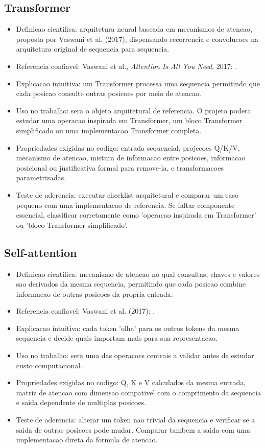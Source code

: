 \subsection{Transformer}


\begin{itemize}
\item Definicao cientifica: arquitetura neural baseada em mecanismos de atencao,
proposta por Vaswani et al. (2017), dispensando recorrencia e convolucoes na
arquitetura original de sequencia para sequencia.
\item Referencia confiavel: Vaswani et al., \emph{Attention Is All You Need}, 2017:
.
\item Explicacao intuitiva: um Transformer processa uma sequencia permitindo que
cada posicao consulte outras posicoes por meio de atencao.
\item Uso no trabalho: sera o objeto arquitetural de referencia. O projeto podera
estudar uma operacao inspirada em Transformer, um bloco Transformer
simplificado ou uma implementacao Transformer completa.
\item Propriedades exigidas no codigo: entrada sequencial, projecoes Q/K/V,
mecanismo de atencao, mistura de informacao entre posicoes, informacao
posicional ou justificativa formal para remove-la, e transformacoes
parametrizadas.
\item Teste de aderencia: executar checklist arquitetural e comparar um caso
pequeno com uma implementacao de referencia. Se faltar componente essencial,
classificar corretamente como 'operacao inspirada em Transformer' ou 'bloco
Transformer simplificado'.
\end{itemize}


\subsection{Self-attention}


\begin{itemize}
\item Definicao cientifica: mecanismo de atencao no qual consultas, chaves e valores
sao derivados da mesma sequencia, permitindo que cada posicao combine
informacao de outras posicoes da propria entrada.
\item Referencia confiavel: Vaswani et al. (2017):
.
\item Explicacao intuitiva: cada token 'olha' para os outros tokens da mesma
sequencia e decide quais importam mais para sua representacao.
\item Uso no trabalho: sera uma das operacoes centrais a validar antes de estudar
custo computacional.
\item Propriedades exigidas no codigo: Q, K e V calculados da mesma entrada, matriz
de atencao com dimensao compativel com o comprimento da sequencia e saida
dependente de multiplas posicoes.
\item Teste de aderencia: alterar um token nao trivial da sequencia e verificar se
a saida de outras posicoes pode mudar. Comparar tambem a saida com uma
implementacao direta da formula de atencao.
\end{itemize}


